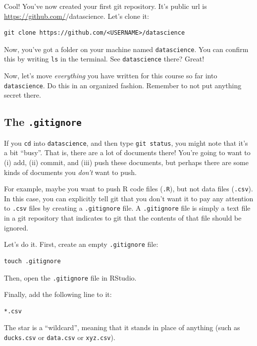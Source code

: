 \documentclass[
]{book}
\begin{document}
Cool! You've now created your first git repository. It's public url is \url{https://github.com/}/datascience. Let's clone it:

\begin{verbatim}
git clone https://github.com/<USERNAME>/datascience
\end{verbatim}

Now, you've got a folder on your machine named \texttt{datascience}. You can confirm this by writing \texttt{ls} in the terminal.
See \texttt{datascience} there? Great!

Now, let's move \emph{everything} you have written for this course so far into \texttt{datascience}. Do this in an organized fashion. Remember to not put anything secret there.

\hypertarget{the-.gitignore}{%
\subsection*{\texorpdfstring{The \texttt{.gitignore}}{The .gitignore}}\label{the-.gitignore}}

If you \texttt{cd} into \texttt{datascience}, and then type \texttt{git\ status}, you might note that it's a bit ``busy''. That is, there are a lot of documents there! You're going to want to (i) add, (ii) commit, and (iii) push these documents, but perhaps there are some kinds of documents you \emph{don't} want to push.

For example, maybe you want to push R code files (\texttt{.R}), but not data files (\texttt{.csv}). In this case, you can explicitly tell git that you don't want it to pay any attention to \texttt{.csv} files by creating a \texttt{.gitignore} file. A \texttt{.gitignore} file is simply a text file in a git repository that indicates to git that the contents of that file should be ignored.

Let's do it. First, create an empty \texttt{.gitignore} file:

\begin{verbatim}
touch .gitignore
\end{verbatim}

Then, open the \texttt{.gitignore} file in RStudio.

Finally, add the following line to it:

\begin{verbatim}
*.csv
\end{verbatim}

The star is a ``wildcard'', meaning that it stands in place of anything (such as \texttt{ducks.csv} or \texttt{data.csv} or \texttt{xyz.csv}).
\end{document}
